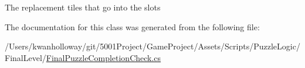 The replacement tiles that go into the slots 



The documentation for this class was generated from the following file\+:\begin{DoxyCompactItemize}
\item 
/\+Users/kwanholloway/git/5001\+Project/\+Game\+Project/\+Assets/\+Scripts/\+Puzzle\+Logic/\+Final\+Level/\hyperlink{_final_puzzle_completion_check_8cs}{Final\+Puzzle\+Completion\+Check.\+cs}\end{DoxyCompactItemize}
